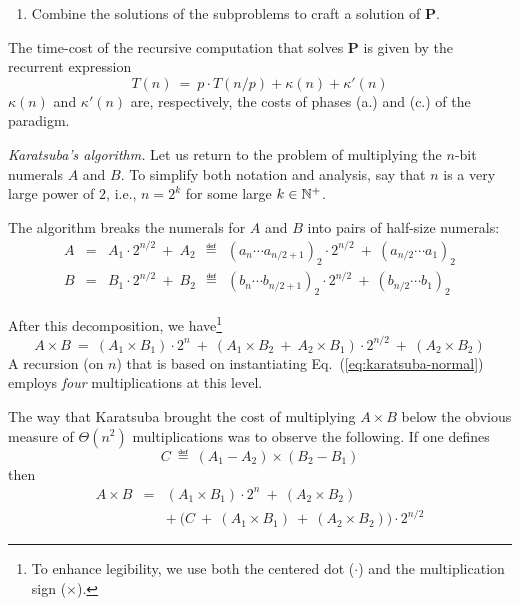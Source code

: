 \begin{enumerate}
{\begin{minipage}{0.96\textwidth}
\begin{enumerate}
\smallskip

Typically, this recursively invokes the {\bf P}-solver---down to some threshold size, at which point base case(s) of the recursion govern the computation.

\medskip\item
Combine the solutions of the subproblems to craft a solution of {\bf P}.
\end{enumerate}

\smallskip

The time-cost of the recursive computation that solves {\bf P} is given by the recurrent expression
\[  T(n) \ = \ p \cdot T(n/p) + \kappa(n) + \kappa'(n) \] 
$\kappa(n)$ and $\kappa'(n)$ are, respectively, the costs of phases (a.) and (c.) of the paradigm.
\end{minipage}
}
\bigskip

\textit{Karatsuba's algorithm.}
Let us return to the problem of multiplying the $n$-bit numerals $A$ and $B$.  To simplify both notation and analysis, say that $n$ is a very large power of $2$, i.e., $n=2^k$ for some large $k \in \mathbb{N}^+$.

\smallskip

The algorithm breaks the numerals for $A$ and $B$ into pairs of half-size numerals:
\begin{eqnarray*}
A & = & A_1 \cdot 2^{n/2} \ + \ A_2 \ \ 
 \eqdef  \ \ (a_n \cdots a_{n/2+1})_2 \cdot 2^{n/2} \ + \ (a_{n/2} \cdots a_1)_2 \\
B & = & B_1 \cdot 2^{n/2} \ + \  B_2 \ \
  \eqdef  \ \ (b_n \cdots b_{n/2+1})_2 \cdot 2^{n/2} \ + \ (b_{n/2} \cdots b_1)_2
\end{eqnarray*}

After this decomposition, we have\footnote{To enhance legibility, we use both the centered dot ($\cdot$) and the multiplication sign ($\times$).}
\begin{equation}
\label{eq:karatsuba-normal}
A \times B \ = \ (A_1 \times B_1) \cdot 2^n \ + \  (A_1 \times B_2 \ + \ A_2 \times B_1) \cdot 2^{n/2} \ + \ (A_2 \times B_2)
\end{equation}
A recursion (on $n$) that is based on instantiating Eq.~(\ref{eq:karatsuba-normal}) employs {\em four} multiplications at this level.

\smallskip

The way that Karatsuba brought the cost of multiplying $A \times B$ below the obvious measure of $\Theta(n^2)$ multiplications was to observe the following.  If one defines
\[ C \ \eqdef \ (A_1 - A_2) \times (B_2 - B_1) \]
then
\begin{eqnarray*}
A \times B & = & (A_1 \times B_1) \cdot 2^n \ + \ (A_2 \times B_2) \\
                 &    & + \ \big(C \ + \ (A_1 \times B_1) \ + \ (A_2 \times B_2) \big) \cdot 2^{n/2}
\end{eqnarray*}


\end{enumerate}

